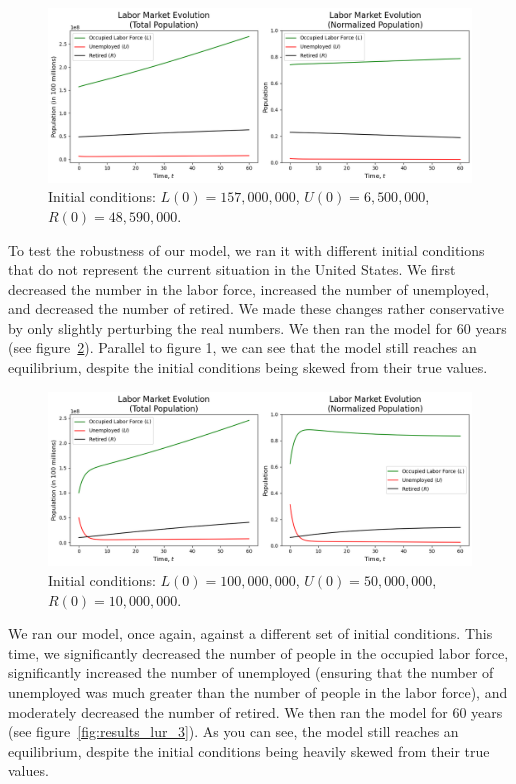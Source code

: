 \documentclass[11pt]{amsart}
\begin{document}
\begin{figure}[h]
    \centering
    \includegraphics[width=\textwidth]{figures/results_lur_1.png}
    \caption{Initial conditions: $L(0) = 157,000,000$, $U(0) = 6,500,000$, $R(0) = 48,590,000$.}
    \label{fig:results_lur_1}
\end{figure}

To test the robustness of our model, we ran it with different initial conditions that do not represent the current situation in the United States. 
We first decreased the number in the labor force, increased the number of unemployed, and decreased the number of retired. We made these changes rather conservative
by only slightly perturbing the real numbers. We then ran the model for 60 years (see figure~\ref{fig:results_lur_2}).
Parallel to figure 1, we can see that the model still reaches an equilibrium, despite the initial conditions being skewed from their true values.

\begin{figure}[h]
    \centering
    \includegraphics[width=\textwidth]{figures/results_lur_2.png}
    \caption{Initial conditions: $L(0) = 100,000,000$, $U(0) = 50,000,000$, $R(0) = 10,000,000$.}
    \label{fig:results_lur_2}
\end{figure}

\newpage


We ran our model, once again, against a different set of initial conditions. This time, we significantly decreased the number of people in the occupied
labor force, significantly increased the number of unemployed (ensuring that the number of unemployed was much greater than the number of people in the labor force), and moderately decreased the number of retired. We then ran the model for 60 years (see figure~\ref{fig:results_lur_3}).
As you can see, the model still reaches an equilibrium, despite the initial conditions being heavily skewed from their true values.
\end{document}
